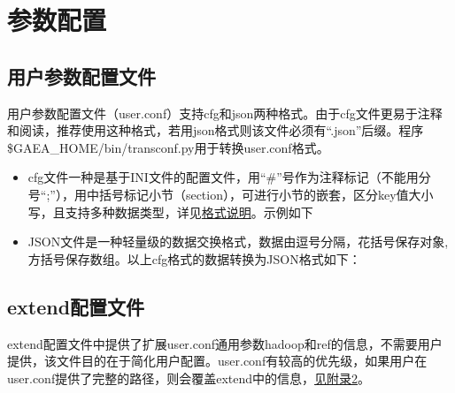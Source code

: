 \documentclass[UTF8,10pt,a4paper]{ctexart}
\begin{document}
\section{参数配置}
\subsection{用户参数配置文件}
用户参数配置文件（user.conf）支持cfg和json两种格式。由于cfg文件更易于注释和阅读，推荐使用这种格式，若用json格式则该文件必须有``.json''后缀。程序\${GAEA\_HOME}/bin/transconf.py用于转换user.conf格式。
\begin{itemize}
\item 
cfg文件一种是基于INI文件的配置文件，用``\#''号作为注释标记（不能用分号``;''），用中括号标记小节（section），可进行小节的嵌套，区分key值大小写，且支持多种数据类型，详见{\kaishu \href{http://configobj.readthedocs.org/en/latest/configobj.html#the-config-file-format}{格式说明}}。示例如下

\item 
JSON文件是一种轻量级的数据交换格式，数据由逗号分隔，花括号保存对象,方括号保存数组。以上cfg格式的数据转换为JSON格式如下：

\end{itemize}
\subsection{extend配置文件}
extend配置文件中提供了扩展user.conf通用参数hadoop和ref的信息，不需要用户提供，该文件目的在于简化用户配置。user.conf有较高的优先级，如果用户在user.conf提供了完整的路径，则会覆盖extend中的信息，{\kaishu \hyperref[C]{见附录2}}。

\end{document}
